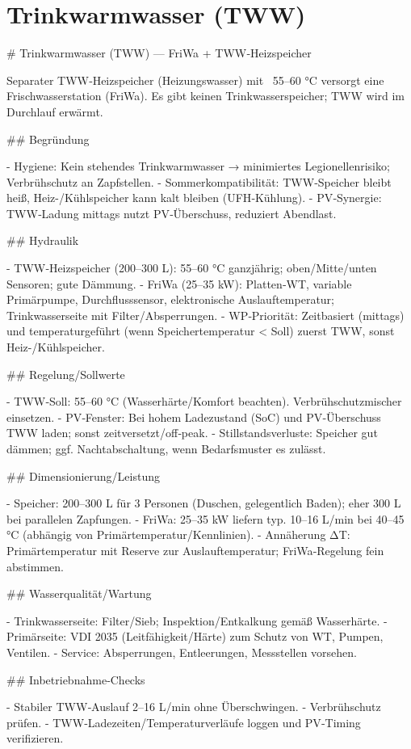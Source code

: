 \documentclass[11pt,oneside]{report}
\begin{document}
\chapter{Trinkwarmwasser (TWW)}
\begin{markdown}
# Trinkwarmwasser (TWW) — FriWa + TWW‑Heizspeicher

Separater TWW‑Heizspeicher (Heizungswasser) mit ~55–60 °C versorgt eine Frischwasserstation (FriWa). Es gibt keinen Trinkwasserspeicher; TWW wird im Durchlauf erwärmt.

## Begründung

- Hygiene: Kein stehendes Trinkwarmwasser → minimiertes Legionellenrisiko; Verbrühschutz an Zapfstellen.
- Sommerkompatibilität: TWW‑Speicher bleibt heiß, Heiz-/Kühlspeicher kann kalt bleiben (UFH‑Kühlung).
- PV‑Synergie: TWW‑Ladung mittags nutzt PV‑Überschuss, reduziert Abendlast.

## Hydraulik

- TWW‑Heizspeicher (200–300 L): 55–60 °C ganzjährig; oben/Mitte/unten Sensoren; gute Dämmung.
- FriWa (25–35 kW): Platten‑WT, variable Primärpumpe, Durchflusssensor, elektronische Auslauftemperatur; Trinkwasserseite mit Filter/Absperrungen.
- WP‑Priorität: Zeitbasiert (mittags) und temperaturgeführt (wenn Speichertemperatur < Soll) zuerst TWW, sonst Heiz-/Kühlspeicher.

## Regelung/Sollwerte

- TWW‑Soll: 55–60 °C (Wasserhärte/Komfort beachten). Verbrühschutzmischer einsetzen.
- PV‑Fenster: Bei hohem Ladezustand (SoC) und PV‑Überschuss TWW laden; sonst zeitversetzt/off‑peak.
- Stillstandsverluste: Speicher gut dämmen; ggf. Nachtabschaltung, wenn Bedarfsmuster es zulässt.

## Dimensionierung/Leistung

- Speicher: 200–300 L für 3 Personen (Duschen, gelegentlich Baden); eher 300 L bei parallelen Zapfungen.
- FriWa: 25–35 kW liefern typ. 10–16 L/min bei 40–45 °C (abhängig von Primärtemperatur/Kennlinien).
- Annäherung ΔT: Primärtemperatur mit Reserve zur Auslauftemperatur; FriWa‑Regelung fein abstimmen.

## Wasserqualität/Wartung

- Trinkwasserseite: Filter/Sieb; Inspektion/Entkalkung gemäß Wasserhärte.
- Primärseite: VDI 2035 (Leitfähigkeit/Härte) zum Schutz von WT, Pumpen, Ventilen.
- Service: Absperrungen, Entleerungen, Messstellen vorsehen.

## Inbetriebnahme‑Checks

- Stabiler TWW‑Auslauf 2–16 L/min ohne Überschwingen.
- Verbrühschutz prüfen.
- TWW‑Ladezeiten/Temperaturverläufe loggen und PV‑Timing verifizieren.
\end{markdown}
\end{document}
